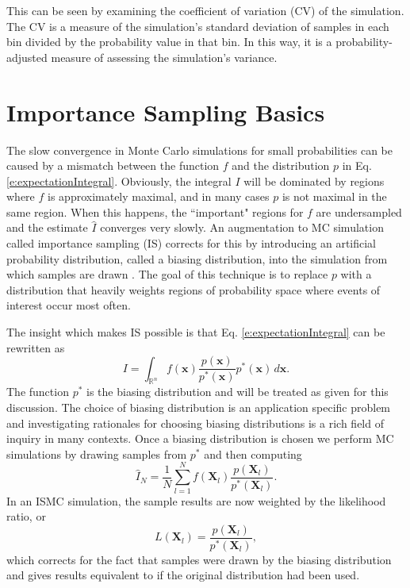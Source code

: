 \documentclass[12pt]{scrartcl}
\begin{document}
This can be seen by examining the coefficient of variation (CV) of the simulation. The CV is a measure of the simulation's standard deviation of samples in each bin divided by the probability value in that bin. In this way, it is a probability-adjusted measure of assessing the simulation's variance.

\section{Importance Sampling Basics}

The slow convergence in Monte Carlo simulations for small probabilities can be caused by a mismatch between the function $f$ and the distribution $p$ in Eq. \eqref{e:expectationIntegral}. Obviously, the integral $I$ will be dominated by regions where $f$ is approximately maximal, and in many cases $p$ is not maximal in the same region. When this happens, the ``important" regions for $f$ are undersampled and the estimate $\hat{I}$ converges very slowly. An augmentation to MC simulation called importance sampling (IS) corrects for this by introducing an artificial probability distribution, called a biasing distribution, into the simulation from which samples are drawn \cite{Bucklew2004}. The goal of this technique is to replace $p$ with a distribution that heavily weights regions of probability space where events of interest occur most often.

The insight which makes IS possible is that Eq. \eqref{e:expectationIntegral} can be rewritten as
%
\begin{equation}
\label{e:biasedIntegral}
I = \int_{\mathbb{R}^n} f(\mathbf{x})\frac{p(\mathbf{x})}{p^*(\mathbf{x})}p^*(\mathbf{x})\,d\mathbf{x}.
\end{equation}
%
The function $p^*$ is the biasing distribution and will be treated as given for this discussion. The choice of biasing distribution is an application specific problem and investigating rationales for choosing biasing distributions is a rich field of inquiry in many contexts. Once a biasing distribution is chosen we perform MC simulations by drawing samples from $p^*$ and then computing
%
\begin{equation}
\label{e:ISMC_sum}
\hat{I}_N = \frac{1}{N}\sum_{l=1}^N f(\mathbf{X}_l)\frac{p(\mathbf{X}_l)}{p^*(\mathbf{X}_l)}.
\end{equation}
%
In an ISMC simulation, the sample results are now weighted by the likelihood ratio, or 
%
\begin{equation}
\label{e:likeRat}
L(\mathbf{X}_l)=\frac{p(\mathbf{X}_l)}{p^*(\mathbf{X}_l)},
\end{equation}
% 
which corrects for the fact that samples were drawn by the biasing distribution and gives results equivalent to if the original distribution had been used. 
\end{document}
